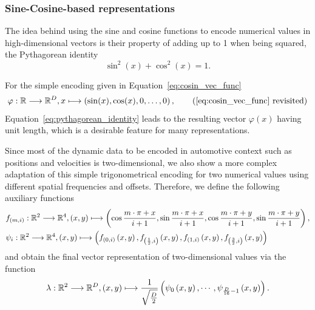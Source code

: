 \subsubsection{Sine-Cosine-based representations}%
\label{ssubsec:sine_cosine_based_representations}

The idea behind using the sine and cosine functions to encode numerical values in high-dimensional vectors is their property of adding up to \num{1} when being squared, the Pythagorean identity
\begin{equation}
\label{eq:pythagorean_identity}
\sin^{2}(x) + \cos^{2}(x) = 1.
\end{equation}

For the simple encoding given in Equation~\eqref{eq:cosin_vec_func} 
\begin{equation}
\abb{\varphi}{\mathbb{R}}{\mathbb{R}^{D}}{x}{\left(\sin(x), \cos(x), 0, \ldots, 0\right)},
\tag{\eqref{eq:cosin_vec_func} revisited}
\end{equation}
Equation~\eqref{eq:pythagorean_identity} leads to the resulting vector $\varphi(x)$ having unit length, which is a desirable feature for many representations.

Since most of the dynamic data to be encoded in automotive context such as positions and velocities is two-dimensional, we also show a more complex adaptation of this simple trigonometrical encoding for two numerical values using different spatial frequencies and offsets.
Therefore, we define the following auxiliary functions
\begin{align}
    &f_{\left(m,i\right)}: \mathbb{R}^2 \longrightarrow \mathbb{R}^4, \left(x,y\right) \longmapsto \left(\cos\frac{m\cdot \pi + x}{i + 1}, \sin\frac{m\cdot \pi + x}{i + 1}, \cos\frac{m\cdot \pi + y}{i + 1}, \sin\frac{m\cdot \pi + y}{i + 1}\right), \label{eq:cos_aux_1} \\
    &\psi_i: \mathbb{R}^2 \longrightarrow \mathbb{R}^4, \left(x,y\right) \longmapsto \left(f_{\left(0,i\right)}\left(x,y\right), f_{\left(\frac{1}{2},i\right)}\left(x,y\right), f_{\left(1,i\right)}\left(x,y\right), f_{\left(\frac{3}{2},i\right)}\left(x,y\right)\right) \label{eq:cos_aux_2}
\end{align}
and obtain the final vector representation of two-dimensional values via the function 
\begin{equation}
\label{eq:cosin_2d_enc}
\lambda: \mathbb{R}^2 \longrightarrow \mathbb{R}^D, \left(x,y\right) \longmapsto \frac{1}{\sqrt{\frac{D}{2}}}\left(\psi_0\left(x,y\right), \cdots, \psi_{\frac{D}{16}-1}\left(x,y\right)\right).
\end{equation}

